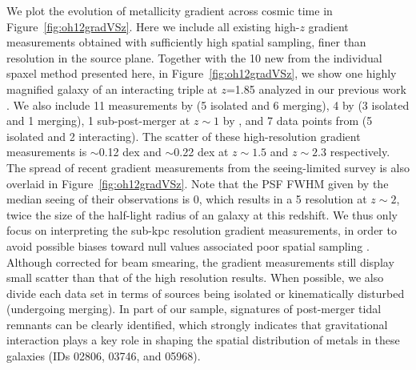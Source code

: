 We plot the evolution of metallicity gradient across cosmic time in
Figure~\ref{fig:oh12gradVSz}. Here we include all existing high-$z$ gradient measurements
obtained with sufficiently high spatial sampling, \ie finer than \kpc resolution in the
source plane. Together with the 10 new \mgms from the individual spaxel method presented
here, in Figure~\ref{fig:oh12gradVSz}, we show one highly magnified galaxy of an interacting
triple at $z$=1.85 analyzed in our previous work \citep{2015AJ....149..107J}.  We also
include 11 measurements by \citet{2015arXiv150901279L} (5 isolated and 6 merging), 4 by
\citet{2013ApJ...765...48J} (3 isolated and 1 merging), 1 sub-\Lstar post-merger at $z\sim1$
by \citet{Frye:2012dr},
and 7 data points from \citet{2012MNRAS.426..935S} (5 isolated and 2 interacting). The
scatter of these high-resolution gradient measurements is $\sim$0.12 dex and $\sim$0.22 dex
at $z\sim1.5$ and $z\sim2.3$ respectively.  The spread of recent gradient measurements from
the seeing-limited \kd survey is also overlaid in Figure~\ref{fig:oh12gradVSz}.  Note that
the PSF FWHM given by the median seeing of their observations is 0, which results in a
5 \kpc resolution at $z\sim2$, twice the size of the half-light radius of an \Lstar galaxy at
this redshift.  We thus only focus on interpreting the sub-kpc resolution gradient
measurements, in order to avoid possible biases toward null values associated poor spatial
sampling \citep[see, \eg,][]{2013ApJ...767..106Y}.  Although corrected for beam smearing, the
\kd gradient measurements still display small scatter than that of the high resolution
results.  When possible, we also divide each data set in terms of sources being isolated or
kinematically disturbed (\ie undergoing merging).  In part of our sample, signatures of
post-merger tidal remnants can be clearly identified, which strongly indicates that
gravitational interaction plays a key role in shaping the spatial distribution of metals in
these galaxies (IDs 02806, 03746, and 05968).

